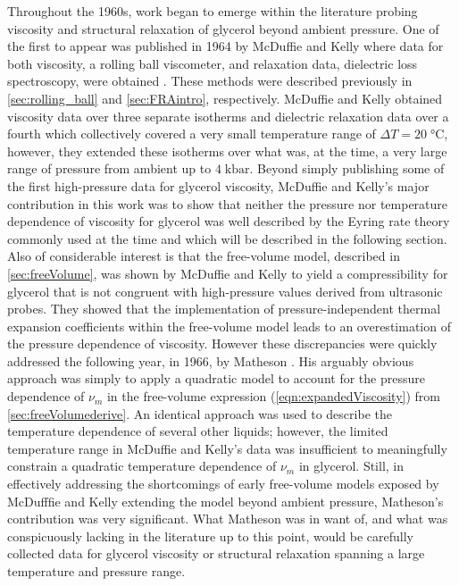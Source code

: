 Throughout the 1960s, work began to emerge within the literature probing viscosity and structural relaxation of glycerol beyond ambient pressure.  One of the first to appear was published in 1964 by McDuffie and Kelly where data for both viscosity, \via a rolling ball viscometer, and relaxation data, \via dielectric loss spectroscopy, were obtained \cite{McDuffie}. These methods were described previously in \sect \ref{sec:rolling_ball} and \sect \ref{sec:FRAintro}, respectively.  McDuffie and Kelly obtained viscosity data over three separate isotherms and dielectric relaxation data over a fourth which collectively covered a very small temperature range of $\Delta T=20 \;\si{\degreeCelsius}$, however, they extended these isotherms over what was, at the time, a very large range of pressure from ambient up to $4\;\si{\kilo\bar}$.  Beyond simply publishing some of the first high-pressure data for glycerol viscosity, McDuffie and Kelly's major contribution in this work was to show that neither the pressure nor temperature dependence of viscosity for glycerol was well described by the Eyring rate theory commonly used at the time and which will be described in the following section.  Also of considerable interest is that the free-volume model, described in \sect\nolinebreak \ref{sec:freeVolume}, was shown by McDuffie and Kelly to yield a compressibility for glycerol that is not congruent with high-pressure values derived from ultrasonic probes. They showed that the implementation of pressure-independent thermal expansion coefficients within the free-volume model leads to an overestimation of the pressure dependence of viscosity.  However these discrepancies were quickly addressed the following year, in 1966, by Matheson \nolinebreak\cite{Matheson}.  His arguably obvious approach was simply to apply a quadratic model to account for the pressure dependence of $\nu_{m}$ in the free-volume expression (\eqn\nolinebreak \ref{eqn:expandedViscosity}) from \sect\nolinebreak \ref{sec:freeVolumederive}.  An identical approach was used to describe the temperature dependence of several other liquids; however, the limited temperature range in McDuffie and Kelly's data was insufficient to meaningfully constrain a quadratic temperature dependence of $\nu_{m}$ in glycerol.  Still, in effectively addressing the shortcomings of early free-volume models exposed by McDufffie and Kelly \via extending the model beyond ambient pressure, Matheson's contribution was very significant. What Matheson was in want of, and what was conspicuously lacking in the literature up to this point, would be carefully collected data for glycerol viscosity or structural relaxation spanning a large temperature and pressure range.

